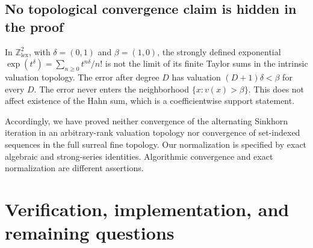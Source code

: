\documentclass[11pt,a4paper]{article}
\numberwithin{equation}{section}
\theoremstyle{definition}
\newcommand{\Z}{\mathbb Z}
\begin{document}
\subsection{No topological convergence claim is hidden in the proof}
In $\Z^2_{\mathrm{lex}}$, with $\delta=(0,1)$ and $\beta=(1,0)$,
the strongly defined exponential
$\exp(t^\delta)=\sum_{n\geq0}t^{n\delta}/n!$ is not the limit of its
finite Taylor sums in the intrinsic valuation topology. The error
after degree $D$ has valuation $(D+1)\delta<\beta$ for every $D$.
The error never enters the neighborhood $\{x:v(x)>\beta\}$.
This does not affect existence of the Hahn sum, which is a
coefficientwise support statement.

Accordingly, we have proved neither convergence of the alternating
Sinkhorn iteration in an arbitrary-rank valuation topology nor
convergence of set-indexed sequences in the full surreal fine
topology. Our normalization is specified by exact algebraic and
strong-series identities. Algorithmic convergence and exact
normalization are different assertions.

\section{Verification, implementation, and remaining questions}
\label{scale:sec:verification}
\end{document}
